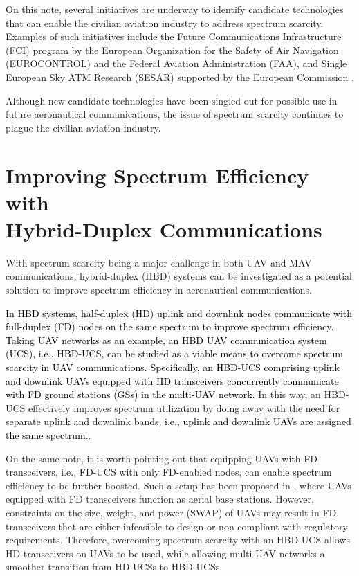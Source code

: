 
On this note, several initiatives are underway to identify candidate technologies that can enable the civilian aviation industry to address spectrum scarcity. Examples of such initiatives include the Future Communications Infrastructure (FCI) program by the European Organization for the Safety of Air Navigation (EUROCONTROL) and the Federal Aviation Administration (FAA), and Single European Sky ATM Research (SESAR) supported by the European Commission \cite{BarbaSesar2011}. 

Although new candidate technologies have been singled out for possible use in future aeronautical communications, the issue of spectrum scarcity continues to plague the civilian aviation industry. 

\section{Improving Spectrum Efficiency with \\ Hybrid-Duplex Communications}

With spectrum scarcity being a major challenge in both UAV and MAV communications, hybrid-duplex (HBD) systems can be investigated as a potential solution to improve spectrum efficiency in aeronautical communications.

\textcolor{black}{In HBD systems, half-duplex (HD) uplink and downlink nodes communicate with full-duplex (FD) nodes on the same spectrum to improve spectrum efficiency. Taking UAV networks as an example, an HBD UAV communication system (UCS), i.e., HBD-UCS, can be studied as a viable means to overcome spectrum scarcity in UAV communications. Specifically, an HBD-UCS comprising uplink and downlink UAVs equipped with HD transceivers concurrently communicate with FD ground stations (GSs) in the multi-UAV network.} In this way, an HBD-UCS effectively improves spectrum utilization by doing away with the need for separate uplink and downlink bands\textcolor{black}{, i.e., uplink and downlink UAVs are assigned the same spectrum}..

On the same note, it is worth pointing out that equipping UAVs with FD transceivers, i.e., FD-UCS with only FD-enabled nodes, can enable spectrum efficiency to be further boosted. Such a setup has been proposed in \cite{zhang2019framework}, where UAVs equipped with FD transceivers function as aerial base stations. However, constraints on the size, weight, and power (SWAP) of UAVs may result in FD transceivers that are either infeasible to design or non-compliant with regulatory requirements. Therefore, overcoming spectrum scarcity with an HBD-UCS allows HD transceivers on UAVs to be used, while allowing multi-UAV networks a smoother transition from HD-UCSs to HBD-UCSs.


